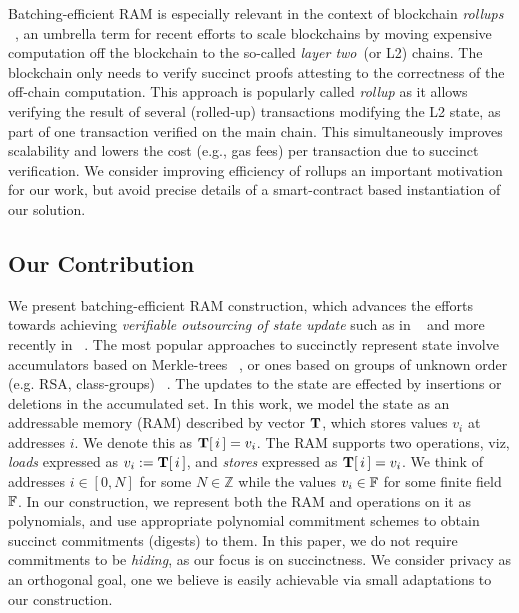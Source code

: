  Batching-efficient RAM is especially relevant in the context of blockchain {\em rollups} ~\cite{rollup},
an umbrella term for recent efforts to scale blockchains by moving expensive computation off the blockchain to the so-called {\em layer two}~(or L2) chains. The blockchain only needs to verify succinct proofs attesting to the correctness of the off-chain computation. This approach is popularly called \textit{rollup} as it allows verifying the result of several (rolled-up) transactions modifying the L2 state, as part of one transaction verified on the main chain.
This simultaneously improves scalability and lowers the cost (e.g., gas fees) per transaction due to succinct verification. We consider improving efficiency of rollups an important motivation for our work, but avoid precise details of a smart-contract based
instantiation of our solution.

\subsection{Our Contribution}\label{subsec:ourwork} 
We present batching-efficient RAM construction, which advances the efforts
towards achieving {\em verifiable outsourcing of state update} such as in ~\cite{EPRINT:BFRSBW13}
and more recently in ~\cite{USENIX:OWWB20, CCS:CFHKKO22}.
The most popular approaches to succinctly represent
state involve accumulators based on Merkle-trees ~\cite{C:Merkle87}, or ones based on groups of unknown order
(e.g. RSA, class-groups) ~\cite{C:CamLys02,C:BonBunFis19,USENIX:OWWB20, CCS:CFHKKO22}.
The updates to the state are effected by insertions or deletions in the  accumulated set.
In this work, we
model the state as an addressable memory (RAM) described by vector $\mathbf{T}$, which stores values $v_i$ at addresses $i$.
We denote this as $\mathbf{T}[\,i\,]=v_i$. The RAM supports two operations, viz, {\em loads} expressed
as $v_i := \mathbf{T}[\,i\,]$, and {\em stores} expressed as $\mathbf{T}[\,i\,]=v_i$.
We think of addresses $i\in [0,N]$ for some $N\in \mathbb{Z}$ while the
values $v_i\in \mathbb{F}$ for some finite field $\mathbb{F}$. In our construction, we represent both the RAM and operations on it
as polynomials, and use appropriate polynomial commitment schemes to obtain succinct commitments (digests) to them.
In this paper, we do not require commitments to be {\em hiding}, as our focus is on succinctness.
We consider privacy as an orthogonal goal, one we believe is easily achievable
via small adaptations to our construction.\smallskip


